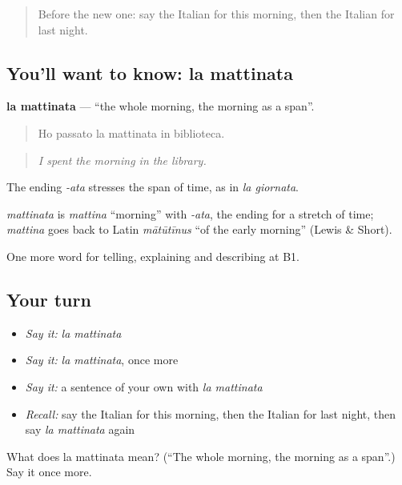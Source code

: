 \label{lesson:IT-C281-mattinata}



\begin{quote}
Before the new one: say the Italian for this morning, then the Italian for last night.
\end{quote}

\subsection*{You'll want to know: la mattinata}
\textbf{la mattinata} — \textquotedblleft{}the whole morning, the morning as a span\textquotedblright{}.

\begin{quote}
Ho passato la mattinata in biblioteca.
\end{quote}

\begin{quote}
\emph{I spent the morning in the library.}
\end{quote}

The ending \emph{-ata} stresses the span of time, as in \emph{la giornata}.

\begin{cousinweb}
\emph{mattinata} is \emph{mattina} \textquotedblleft{}morning\textquotedblright{} with \emph{-ata}, the ending for a stretch of time; \emph{mattina} goes back to Latin \emph{mātūtīnus} \textquotedblleft{}of the early morning\textquotedblright{} (Lewis \& Short).
\end{cousinweb}

\begin{grammarlens}[title={What you've built}]
One more word for telling, explaining and describing at B1.
\end{grammarlens}

\subsection*{Your turn}
\begin{itemize}
\raggedright
  \item \emph{Say it:} \emph{la mattinata}
  \item \emph{Say it:} \emph{la mattinata}, once more
  \item \emph{Say it:} a sentence of your own with \emph{la mattinata}
  \item \emph{Recall:} say the Italian for this morning, then the Italian for last night, then say \emph{la mattinata} again
\end{itemize}

\begin{tcolorbox}[breakable,colback=teal!4,colframe=teal!35!black,title={Before you move on}]
What does la mattinata mean? (\textquotedblleft{}The whole morning, the morning as a span\textquotedblright{}.) Say it once more.
\end{tcolorbox}

